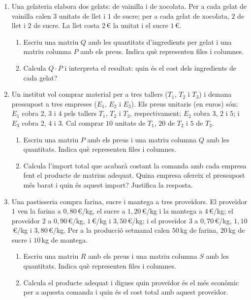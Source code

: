 \documentclass[12pt,a4paper]{article}
\newcommand{\blocInici}{%
  \par\nobreak\vspace{0pt}%
  \begin{minipage}[t]{\linewidth}%
}
\newcommand{\blocFi}{%
  \end{minipage}%
  \par
}
\begin{document}
\begin{enumerate}[leftmargin=*,itemsep=0.55em,parsep=0.2em]
\item
{}%
\blocInici
Una gelateria elabora dos gelats: de vainilla i de xocolata.
Per a cada gelat de vainilla calen $3$ unitats de llet i $1$ de sucre;
per a cada gelat de xocolata, $2$ de llet i $2$ de sucre.
La llet costa $2$\,\euro{} la unitat i el sucre $1$\,\euro{}.
\begin{enumerate}[label=\alph*),leftmargin=1.4em,itemsep=0.25em]
  \item Escriu una matriu $Q$ amb les quantitats d'ingredients per gelat
    i una matriu columna $P$ amb els preus. Indica què representen files i columnes.
  \item Calcula $Q \cdot P$ i interpreta el resultat:
    quin és el cost dels ingredients de cada gelat?
\end{enumerate}
\blocFi

\item
{}%
\blocInici
Un institut vol comprar material per a tres tallers ($T_1$, $T_2$ i $T_3$)
i demana pressupost a tres empreses ($E_1$, $E_2$ i $E_3$).
Els preus unitaris (en euros) són:
$E_1$ cobra $2$, $3$ i $4$ pels tallers $T_1$, $T_2$ i $T_3$, respectivament;
$E_2$ cobra $3$, $2$ i $5$;
i $E_3$ cobra $2$, $4$ i $3$.
Cal comprar $10$ unitats de $T_1$, $20$ de $T_2$ i $5$ de $T_3$.
\begin{enumerate}[label=\alph*),leftmargin=1.4em,itemsep=0.25em]
  \item Escriu una matriu $P$ amb els preus i una matriu columna $Q$ amb les quantitats.
    Indica què representen files i columnes.
  \item Calcula l'import total que acabarà costant la comanda amb cada empresa
    fent el producte de matrius adequat.
    Quina empresa ofereix el pressupost més barat i quin és aquest import?
    Justifica la resposta.
\end{enumerate}
\blocFi

\item
{}%
\blocInici
Una pastisseria compra farina, sucre i mantega a tres proveïdors.
El proveïdor $1$ ven la farina a $0{,}80$\,\euro{}/kg, el sucre a $1{,}20$\,\euro{}/kg
i la mantega a $4$\,\euro{}/kg;
el proveïdor $2$ a $0{,}90$\,\euro{}/kg, $1$\,\euro{}/kg i $3{,}50$\,\euro{}/kg;
i el proveïdor $3$ a $0{,}70$\,\euro{}/kg, $1{,}10$\,\euro{}/kg i $3{,}80$\,\euro{}/kg.
Per a la producció setmanal calen $50$\,kg de farina, $20$\,kg de sucre i $10$\,kg de mantega.
\begin{enumerate}[label=\alph*),leftmargin=1.4em,itemsep=0.25em]
  \item Escriu una matriu $R$ amb els preus i una matriu columna $S$ amb les quantitats.
    Indica què representen files i columnes.
  \item Calcula el producte adequat i digues quin proveïdor és el més econòmic
    per a aquesta comanda i quin és el cost total amb aquest proveïdor.
\end{enumerate}
\blocFi


\end{enumerate}
\end{document}
